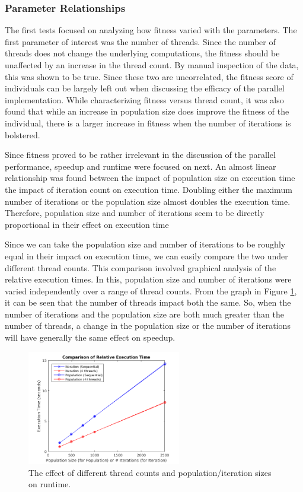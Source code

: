 \documentclass[10pt,letterpaper]{article}
\begin{document}
\subsubsection{Parameter Relationships}
The first tests focused on analyzing how fitness varied with the parameters. The first parameter of interest was the number of threads. Since the number of threads does not change the underlying computations, the fitness should be unaffected by an increase in the thread count. By manual inspection of the data, this was shown to be true. Since these two are uncorrelated, the fitness score of individuals can be largely left out when discussing the efficacy of the parallel implementation. While characterizing fitness versus thread count, it was also found that while an increase in population size does improve the fitness of the individual, there is a larger increase in fitness when the number of iterations is bolstered.

Since fitness proved to be rather irrelevant in the discussion of the parallel performance, speedup and runtime were focused on next. An almost linear relationship was found between the impact of population size on execution time the impact of iteration count on execution time. Doubling either the maximum number of iterations or the population size almost doubles the execution time. Therefore, population size and number of iterations seem to be directly proportional in their effect on execution time

Since we can take the population size and number of iterations to be roughly equal in their impact on execution time, we can easily compare the two under different thread counts. This comparison involved graphical analysis of the relative execution times. In this, population size and number of iterations were varied independently over a range of thread counts. From the graph in Figure \ref{fig:itervspop}, it can be seen that the number of threads impact both the same. So, when the number of iterations and the population size are both much greater than the number of threads, a change in the population size or the number of iterations will have generally the same effect on speedup.

\begin{figure}
\centering
\includegraphics[width=0.6\textwidth]{../img/Lenovo_Compare_ItervsPop.png}
\caption{The effect of different thread counts and population/iteration sizes on runtime.}
\label{fig:itervspop}
\end{figure}
\end{document}
